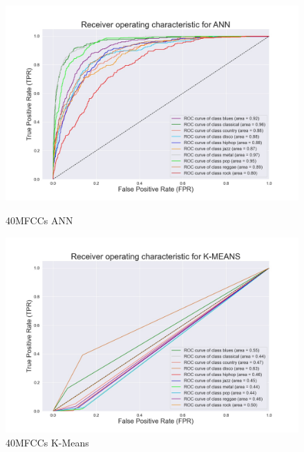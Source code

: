 \documentclass[conference]{IEEEtran}
\begin{document}
\begin{figure}[!ht]
\begin{center}
\begin{minipage}[t]{.24\textwidth}
        \end{minipage}
        \begin{minipage}[t]{.24\textwidth}
            \centering
            \includegraphics[width=\textwidth]{plot/SL/frequency_features/40/ANN_40MFCC_10000_10GEN_GTZAN - ROC Plot.jpg}
            \caption{40MFCCs ANN}
            \label{fig:40MFCCs ANN Frequency Features}
        \end{minipage}
        \begin{minipage}[t]{.24\textwidth}
            \centering
            \includegraphics[width=\textwidth]{plot/UL/frequency_features/40/40MFCC_10000_10GEN_GTZAN - ROC Plot.jpg}
            \caption{40MFCCs K-Means}
            \label{fig:40MFCCs K-Means Frequency Features}
        \end{minipage}
    \end{center}
\end{figure}
\end{document}
